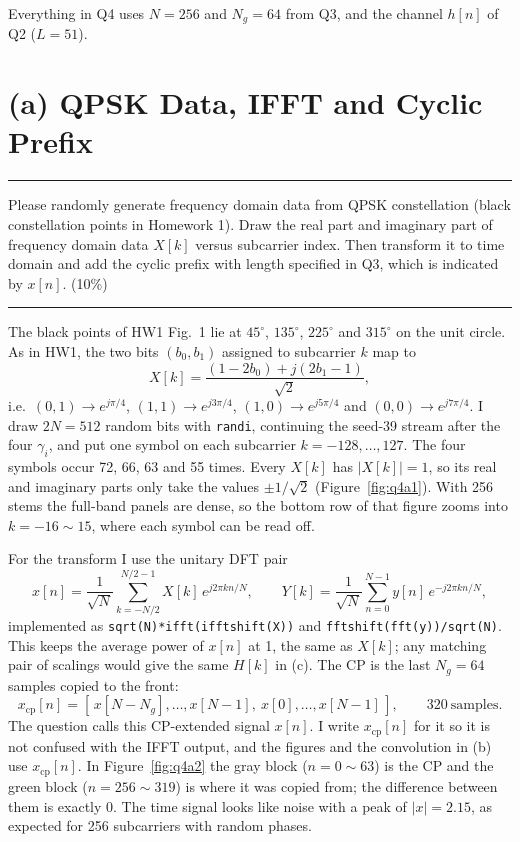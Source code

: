 \documentclass[12pt,a4paper]{report}
\newcommand{\question}[1]{%
    \hrule
    \vspace{0.2cm}
    #1
    \vspace{0.2cm}
    \hrule
    \vspace{0.5cm}
}
\begin{document}
Everything in Q4 uses $N = 256$ and $N_g = 64$ from Q3, and the channel $h[n]$ of Q2 ($L = 51$).

\section{(a) QPSK Data, IFFT and Cyclic Prefix}

\question{Please randomly generate frequency domain data from QPSK constellation (black constellation points in
Homework 1). Draw the real part and imaginary part of frequency domain data $X[k]$ versus subcarrier index. Then
transform it to time domain and add the cyclic prefix with length specified in Q3, which is indicated by $x[n]$. (10\%)}

The black points of HW1 Fig.~1 lie at $45^\circ$, $135^\circ$, $225^\circ$ and $315^\circ$ on the unit circle. As in
HW1, the two bits $(b_0, b_1)$ assigned to subcarrier $k$ map to
\begin{equation}
    X[k] = \frac{(1 - 2b_0) + j(2b_1 - 1)}{\sqrt 2},
\end{equation}
i.e.\ $(0,1) \to e^{j\pi/4}$, $(1,1) \to e^{j3\pi/4}$, $(1,0) \to e^{j5\pi/4}$ and $(0,0) \to e^{j7\pi/4}$.
I draw $2N = 512$ random bits with \texttt{randi}, continuing the seed-39 stream after the four $\gamma_i$, and put
one symbol on each subcarrier $k = -128, \ldots, 127$. The four symbols occur 72, 66, 63 and 55 times. Every $X[k]$
has $|X[k]| = 1$, so its real and imaginary parts only take the values $\pm 1/\sqrt 2$ (Figure~\ref{fig:q4a1}). With
256 stems the full-band panels are dense, so the bottom row of that figure zooms into $k = -16 \sim 15$, where each
symbol can be read off.

For the transform I use the unitary DFT pair
\begin{equation}
    x[n] = \frac{1}{\sqrt N}\sum_{k=-N/2}^{N/2-1} X[k]\,e^{j2\pi kn/N}, \qquad
    Y[k] = \frac{1}{\sqrt N}\sum_{n=0}^{N-1} y[n]\,e^{-j2\pi kn/N},
\end{equation}
implemented as \texttt{sqrt(N)*ifft(ifftshift(X))} and \texttt{fftshift(fft(y))/sqrt(N)}. This keeps the average power
of $x[n]$ at 1, the same as $X[k]$; any matching pair of scalings would give the same $H[k]$ in (c). The CP is the last
$N_g = 64$ samples copied to the front:
\begin{equation}
    x_{\mathrm{cp}}[n] = [\,x[N - N_g], \ldots, x[N-1],\ x[0], \ldots, x[N-1]\,], \qquad 320\ \text{samples}.
\end{equation}
The question calls this CP-extended signal $x[n]$. I write $x_{\mathrm{cp}}[n]$ for it so it is not confused with the
IFFT output, and the figures and the convolution in (b) use $x_{\mathrm{cp}}[n]$.
In Figure~\ref{fig:q4a2} the gray block ($n = 0 \sim 63$) is the CP and the green block ($n = 256 \sim 319$) is where it
was copied from; the difference between them is exactly 0. The time signal looks like noise with a peak of
$|x| = 2.15$, as expected for 256 subcarriers with random phases.
\end{document}
